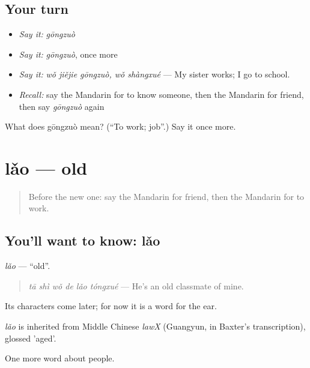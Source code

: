\subsection*{Your turn}
\begin{itemize}
\raggedright
  \item \emph{Say it:} \emph{gōngzuò}
  \item \emph{Say it:} \emph{gōngzuò}, once more
  \item \emph{Say it:} \emph{wǒ jiějie gōngzuò, wǒ shàngxué} — My sister works; I go to school.
  \item \emph{Recall:} say the Mandarin for to know someone, then the Mandarin for friend, then say \emph{gōngzuò} again
\end{itemize}

\begin{tcolorbox}[breakable,colback=teal!4,colframe=teal!35!black,title={Before you move on}]
What does gōngzuò mean? (\textquotedblleft{}To work; job\textquotedblright{}.) Say it once more.
\end{tcolorbox}
\section[lǎo]{lǎo — old}

\label{lesson:ZH-C35-lao}



\begin{quote}
Before the new one: say the Mandarin for friend, then the Mandarin for to work.
\end{quote}

\subsection*{You'll want to know: lǎo}
\emph{lǎo} — \textquotedblleft{}old\textquotedblright{}.

\begin{quote}
\emph{tā shì wǒ de lǎo tóngxué} — He's an old classmate of mine.
\end{quote}

Its characters come later; for now it is a word for the ear.

\begin{cousinweb}
\emph{lǎo} is inherited from Middle Chinese \emph{lawX} (Guangyun, in Baxter's transcription), glossed 'aged'.
\end{cousinweb}

\begin{grammarlens}[title={What you've built}]
One more word about people.
\end{grammarlens}

